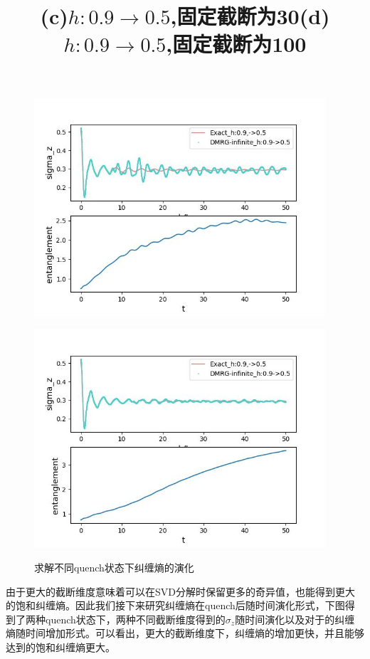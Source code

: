 \documentclass[12pt]{article}
\begin{document}
\begin{figure}[H]
     	\begin{minipage}{0.49\linewidth}
     		\centering
     		\includegraphics[width=1\linewidth, height=230pt]{ee4}
     		\title{(c)$h:0.9\to0.5$,固定截断为30}
     		\label{fig:31}
     	\end{minipage}
     	\begin{minipage}{0.49\linewidth}
     		\centering
     		\includegraphics[width=1\linewidth, height=230pt]{ee3}
     		\title{(d)$h:0.9\to0.5$,固定截断为100}
     		\label{fig:32}
     	\end{minipage}
     	\caption[9pt]{求解不同quench状态下纠缠熵的演化}
     \end{figure}
 
 由于更大的截断维度意味着可以在SVD分解时保留更多的奇异值，也能得到更大的饱和纠缠熵。因此我们接下来研究纠缠熵在quench后随时间演化形式，下图得到了两种quench状态下，两种不同截断维度得到的$\sigma_z$随时间演化以及对于的纠缠熵随时间增加形式。可以看出，更大的截断维度下，纠缠熵的增加更快，并且能够达到的饱和纠缠熵更大。
     
\end{document}
